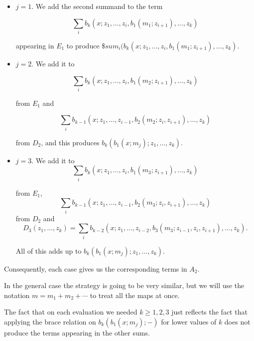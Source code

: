 \documentclass[twoside]{article}
\begin{document}
\begin{itemize}
\item $j=1$. We add the second summand to the term 

$$\sum_ib_k(x;z_1,\dots, z_i,b_1(m_1;z_{i+1}),\dots, z_{k})$$

appearing in $E_1$ to produce $\$sum_i(b_k(x;z_1,\dots, z_i,b_1(m_1;z_{i+1}),\dots, z_{k})$.

\item $j=2$. We add it to 

$$\sum_ib_k(x;z_1,\dots, z_i,b_1(m_2;z_{i+1}),\dots, z_{k})$$

from $E_1$ and 

$$\sum_ib_{k-1}(x;z_1,\dots, z_{i-1}, b_2(m_2;z_i,z_{i+1}),\dots,z_{k})$$

from $D_2$, and this produces $b_k(b_1(x;m_j);z_1,\dots, z_k)$.

\item $j=3$. We add it to 
$$\sum_ib_k(x;z_1,\dots, z_i,b_1(m_3;z_{i+1}),\dots, z_{k})$$

from $E_1$, 
$$\sum_ib_{k-1}(x;z_1,\dots, z_{i-1}, b_2(m_3;z_i,z_{i+1}),\dots,z_{k})$$
from $D_2$ and
$$D_3(z_1,\dots, z_{k})=\sum_ib_{k-2}(x;z_1,\dots, z_{i-2}, b_3(m_3;z_{i-1},z_i,z_{i+1}),\dots,z_{k}).$$

All of this adds up to $b_k(b_1(x;m_j);z_1,\dots, z_k)$.

\end{itemize} 

Consequently, each case gives us the corresponding terms in $A_2$.



In the general case the strategy is going to be very similar, but we will use the notation $m=m_1+m_2+\cdots$ to treat all the maps at once. 

\begin{remark}
The fact that on each evaluation we needed $k\geq 1,2,3$ just reflects the fact that applying the brace relation on $b_k(b_1(x;m_j);-)$ for lower values of $k$ does not produce the terms appearing in the other sums. 
\end{remark}


\end{document}
